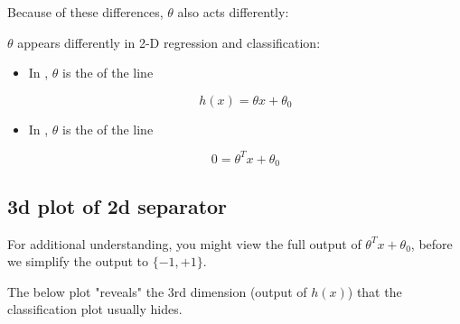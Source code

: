         
        
        Because of these differences, $\theta$ also acts differently:\\
        
        \begin{clarification}
            $\theta$ appears differently in 2-D regression and classification:
            
            \begin{itemize}
                \item In , $\theta$ is the  of the line
                
                    \begin{equation*}
                        h(x) = \theta x + \theta_0
                    \end{equation*}
                
                \item In , $\theta$ is the  of the line
                
                    \begin{equation*}
                        0 = \theta^T x + \theta_0
                    \end{equation*}
                
            \end{itemize}
        \end{clarification}
        
    \subsection{3d plot of 2d separator}
    
        For additional understanding, you might view the full output of $\theta^T x + \theta_0$, before we simplify the output to $\{-1,+1\}$.

        The below plot "reveals" the 3rd dimension (output of $h(x)$) that the classification plot usually hides.
        
